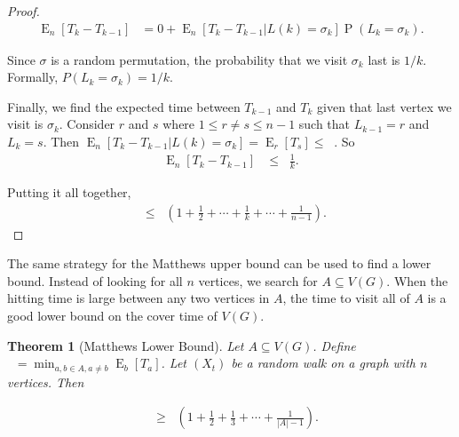 \documentclass[12pt]{article}
\newtheorem{theorem}{Theorem}
\theoremstyle{definition}
\DeclareMathOperator{\E}{\mathrm{E}}		     %
\DeclareMathOperator{\pr}{\mathrm{P}}		     %
\DeclareMathOperator{\tcov}{t_\textrm{cov}}      %
\DeclareMathOperator{\hit}{t_{\textrm{hit}}}     %
\DeclareMathOperator{\tmina}{t_\textrm{min}^A}   %
\begin{document}
\begin{proof}
\begin{align}
\E_n[T_k - T_{k-1}] &= 0 +
\E_n[T_k - T_{k-1} | L(k) = \sigma_k]
\pr(L_k = \sigma_k). \nonumber 
\end{align}

Since $\sigma$ is a random permutation, the probability that
we visit $\sigma_k$ last is $1/k$.
Formally, $P(L_k = \sigma_k) = 1/k$.

Finally, we find the expected time between $T_{k-1}$ and $T_{k}$
given that last vertex we visit is $\sigma_k$.
Consider $r$ and $s$ where $1 \leq r \neq s \leq n-1$
such that $L_{k-1} = r$ and $L_k = s$.
Then $\E_n[T_k - T_{k-1} | L(k) = \sigma_k] = \E_r[T_s] \leq \hit$.
So
\begin{align}
\E_n[T_k - T_{k-1}] &\leq
\hit \frac{1}{k}. \nonumber 
\end{align}

Putting it all together,
\begin{align}
\tcov \leq \hit \left( 1+ \frac{1}{2} + \cdots + \frac{1}{k} 
+ \cdots + \frac{1}{n-1} \right). \nonumber
\end{align}
\end{proof}

The same strategy for the Matthews upper bound can be used
to find a lower bound.
Instead of looking for all $n$ vertices, we search
for $A \subseteq V(G)$.
When the hitting time is large between any two vertices in $A$,
the time to visit all of $A$ is a good lower bound on the cover time
of $V(G)$.

\begin{theorem}[Matthews Lower Bound]
Let $A \subseteq V(G)$. Define $\tmina = \min_{a,b\in A, a \neq b} \E_b[T_a]$.
Let $(X_t)$ be a random walk on a graph with $n$ vertices. Then \label{thm:matthews_low}
\end{theorem}
\begin{align}
\tcov &\geq \tmina \left(1 + \frac{1}{2} + \frac{1}{3} + \cdots +
\frac{1}{|A| -1} \right). \nonumber
\end{align}
\end{document}
